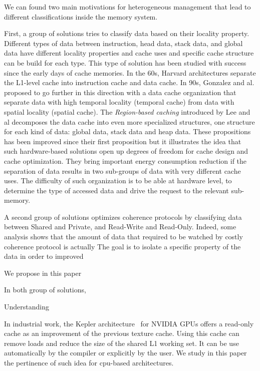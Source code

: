 \documentclass[sigconf]{acmart}
\begin{document}
We can found two main motivations for heterogeneous management that lead to different classifications inside the memory system.

First, a group of solutions tries to classify data based on their locality property. Different types of data between instruction, head data, stack data, and global data have different locality properties and cache uses and specific cache structure can be build for each type. This type of solution has been studied with success since the early days of cache memories. In the 60s, Harvard architectures separate the L1-level cache into instruction cache and data cache. In 90s, Gonzalez and al.\cite{Gonzalez:1995} proposed to go further in this direction with a data cache organization that separate data with high temporal locality (temporal cache) from data with spatial locality (spatial cache). The \textit{Region-based caching} introduced by Lee and al\cite{Lee:2000} decomposes the data cache into even more specialized structures, one structure for each kind of data: global data, stack data and heap data. These propositions has been improved since their first proposition but it illustrates the idea that such hardware-based solutions open up degrees of freedom for cache design and cache optimization. They bring important energy consumption reduction if the separation of data results in two sub-groups of data with very different cache uses. The difficulty of such organization is to be able at hardware level, to determine the type of accessed data and drive the request to the relevant sub-memory.

A second group of solutions optimizes coherence protocols by classifying data between Shared and Private, and Read-Write and Read-Only. Indeed, some analysis shows that the amount of data that required to be watched by costly coherence protocol is actually   
The goal is to isolate a specific property of the data in order to improved 

We propose in this paper 

In both group of solutions, 

Understanding 

In industrial work, the Kepler architecture~\cite{NVIDIA:2007} for NVIDIA GPUs offers a read-only cache as an improvement of the previous texture cache. Using this cache can remove loads and reduce the size of the shared L1 working set. It can be use automatically by the compiler or explicitly by the user. We study in this paper the pertinence of such idea for cpu-based architectures.
\end{document}

